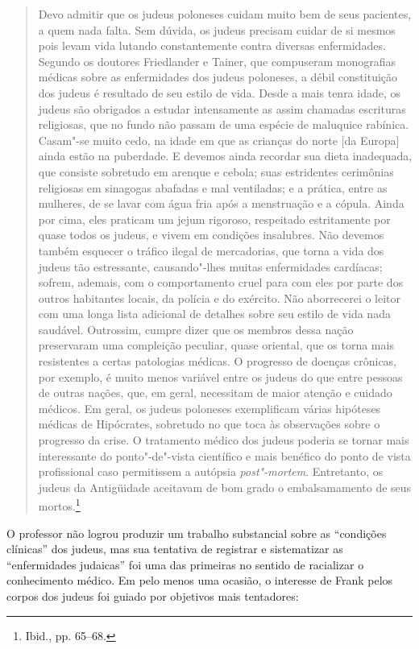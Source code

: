 \begin{quote}
Devo admitir que os judeus poloneses cuidam muito bem de seus pacientes,
a quem nada falta. Sem dúvida, os judeus precisam cuidar de si mesmos
pois levam vida lutando constantemente contra diversas enfermidades.
Segundo os doutores Friedlander e Tainer, que compuseram monografias
médicas sobre as enfermidades dos judeus poloneses, a débil constituição
dos judeus é resultado de seu estilo de vida. Desde a mais tenra idade,
os judeus são obrigados a estudar intensamente as assim chamadas
escrituras religiosas, que no fundo não passam de uma espécie de
maluquice rabínica. Casam"-se muito cedo, na idade em que as crianças do
norte {[}da Europa{]} ainda estão na puberdade. E devemos ainda recordar
sua dieta inadequada, que consiste sobretudo em arenque e cebola; suas
estridentes cerimônias religiosas em sinagogas abafadas e mal
ventiladas; e a prática, entre as mulheres, de se lavar com água fria
após a menstruação e a cópula. Ainda por cima, eles praticam um jejum
rigoroso, respeitado estritamente por quase todos os judeus, e vivem em
condições insalubres. Não devemos também esquecer o tráfico ilegal de
mercadorias, que torna a vida dos judeus tão estressante, causando"-lhes
muitas enfermidades cardíacas; sofrem, ademais, com o comportamento
cruel para com eles por parte dos outros habitantes locais, da polícia e
do exército. Não aborrecerei o leitor com uma longa lista adicional de
detalhes sobre seu estilo de vida nada saudável. Outrossim, cumpre dizer
que os membros dessa nação preservaram uma compleição peculiar, quase
oriental, que os torna mais resistentes a certas patologias médicas. O
progresso de doenças crônicas, por exemplo, é muito menos variável entre
os judeus do que entre pessoas de outras nações, que, em geral,
necessitam de maior atenção e cuidado médicos. Em geral, os judeus
poloneses exemplificam várias hipóteses médicas de Hipócrates, sobretudo
no que toca às observações sobre o progresso da crise. O tratamento
médico dos judeus poderia se tornar mais interessante do ponto"-de"-vista
científico e mais benéfico do ponto de vista profissional caso
permitissem a autópsia \emph{post"-mortem}. Entretanto, os judeus da
Antigüidade aceitavam de bom grado o embalsamamento de seus
mortos.\footnote{Ibid., pp. 65--68.}
\end{quote}

O professor não logrou produzir um trabalho substancial sobre as
``condições clínicas'' dos judeus, mas sua tentativa de registrar e
sistematizar as ``enfermidades judaicas'' foi uma das primeiras no
sentido de racializar o conhecimento médico. Em pelo menos uma ocasião,
o interesse de Frank pelos corpos dos judeus foi guiado por objetivos
mais tentadores:


